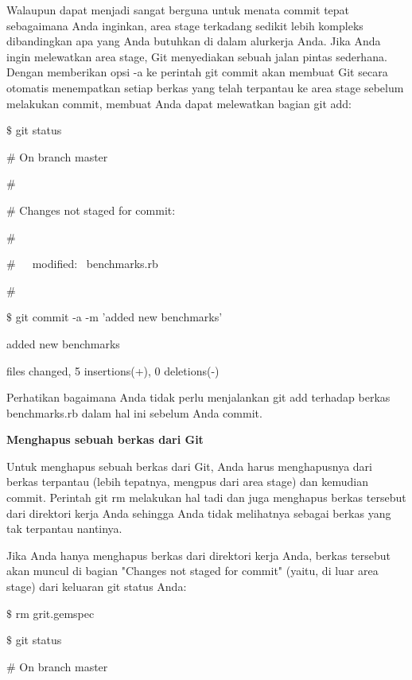 \noindent 
Walaupun dapat menjadi sangat berguna untuk menata commit tepat sebagaimana Anda inginkan, area stage terkadang sedikit lebih kompleks dibandingkan apa yang Anda butuhkan di dalam alurkerja Anda. Jika Anda ingin melewatkan area stage, Git menyediakan sebuah jalan pintas sederhana. Dengan memberikan opsi -a ke perintah git commit akan membuat Git secara otomatis menempatkan setiap berkas yang telah terpantau ke area stage sebelum melakukan commit, membuat Anda dapat melewatkan bagian git add: \par
\vspace{12pt}
\noindent 
 $  \$  $ git status \par
\noindent 
 $  \#  $ On branch master \par
\noindent 
 $  \#  $ \par
\noindent 
 $  \#  $ Changes not staged for commit: \par
\noindent 
 $  \#  $ \par
\noindent 
 $  \#  $~~~modified:~  benchmarks.rb \par
\noindent 
 $  \#  $ \par
\noindent 
 $  \$  $ git commit -a -m 'added new benchmarks' \par
\noindent 
[master 83e38c7] added new benchmarks \par
{} files changed, 5 insertions(+), 0 deletions(-) \par
\vspace{12pt}
\noindent 
Perhatikan bagaimana Anda tidak perlu menjalankan git add terhadap berkas benchmarks.rb dalam hal ini sebelum Anda commit. \par
\noindent 
\textbf{M}\textbf{enghapus sebuah berkas dari Git} \par
\noindent 
Untuk menghapus sebuah berkas dari Git, Anda harus menghapusnya dari berkas terpantau (lebih tepatnya, mengpus dari area stage) dan kemudian commit. Perintah git rm melakukan hal tadi dan juga menghapus berkas tersebut dari direktori kerja Anda sehingga Anda tidak melihatnya sebagai berkas yang tak terpantau nantinya. \par
\noindent 
Jika Anda hanya menghapus berkas dari direktori kerja Anda, berkas tersebut akan muncul di bagian "Changes not staged for commit" (yaitu, di luar area stage) dari keluaran git status Anda: \par
\noindent 
 $  \$  $ rm grit.gemspec \par
\noindent 
 $  \$  $ git status \par
\noindent 
 $  \#  $ On branch master \par
